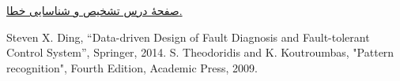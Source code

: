 \documentclass{article}
\begin{document}
\renewcommand{\section}[2]{}%
\begin{thebibliography}{99} %
 \href{https://vc4012.kntu.ac.ir/course/view.php?id=258}{صفحۀ درس تشخیص و شناسایی خطا.}
\begin{LTRitems}
\resetlatinfont
{} Steven X. Ding, “Data-driven Design of Fault Diagnosis and Fault-tolerant Control System”, Springer, 2014.
 S. Theodoridis and K. Koutroumbas, "Pattern recognition", Fourth Edition, Academic Press, 2009.
\end{LTRitems}

\end{thebibliography}
\end{document}
